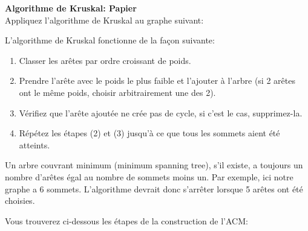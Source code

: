 \begin{Exercice}[5 minutes] \textbf{Algorithme de Kruskal\!: Papier}\\
    Appliquez l'algorithme de Kruskal au graphe suivant\!:\\
    \begin{center}
\end{center}
    \begin{conseil}
        L'algorithme de Kruskal fonctionne de la façon suivante\!:
        \begin{enumerate}
            \item Classer les arêtes par ordre croissant de poids.
            \item Prendre l'arête avec le poids le plus faible et l'ajouter à l'arbre (si 2 arêtes ont le même poids, choisir arbitrairement une des 2).
            \item Vérifiez que l'arête ajoutée ne crée pas de cycle, si c'est le cas, supprimez-la.
            \item Répétez les étapes (2) et (3) jusqu'à ce que tous les sommets aient été atteints.
        \end{enumerate}
        Un arbre couvrant minimum (minimum spanning tree), s'il existe, a toujours un nombre d'arêtes égal au nombre de sommets moins un. Par exemple, ici notre graphe a 6 sommets. L'algorithme devrait donc s'arrêter lorsque 5 arêtes ont été choisies.
    \end{conseil}
    \begin{solution}
        Vous trouverez ci-dessous les étapes de la construction de l'ACM:\\
        \begin{center}
\end{center}
\end{solution}
\end{Exercice}

